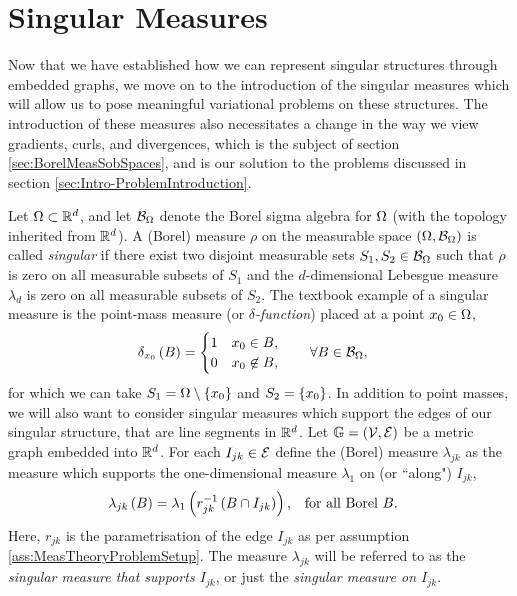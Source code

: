 \section{Singular Measures} \label{sec:SingularMeasures}
Now that we have established how we can represent singular structures through embedded graphs, we move on to the introduction of the singular measures which will allow us to pose meaningful variational problems on these structures.
The introduction of these measures also necessitates a change in the way we view gradients, curls, and divergences, which is the subject of section \ref{sec:BorelMeasSobSpaces}, and is our solution to the problems discussed in section \ref{sec:Intro-ProblemIntroduction}.

Let $\Omega\subset\mathbb{R}^d$, and let $\mathcal{B}_{\Omega}$ denote the Borel sigma algebra for $\Omega$ (with the topology inherited from $\mathbb{R}^d$).
A (Borel) measure $\rho$ on the measurable space $\left( \Omega,\mathcal{B}_{\Omega} \right)$ is called \emph{singular} if there exist two disjoint measurable sets $S_1,S_2\in \mathcal{B}_{\Omega}$ such that $\rho$ is zero on all measurable subsets of $S_1$ and the $d$-dimensional Lebesgue measure $\lambda_d$ is zero on all measurable subsets of $S_2$.
The textbook example of a singular measure is the point-mass measure (or \emph{$\delta$-function}) placed at a point $x_0\in\Omega$,
\begin{align*}
	\delta_{x_0}\left( B \right) &= \begin{cases} 1 & x_0\in B, \\ 0 & x_0\not\in B, \end{cases}
	\qquad \forall B\in\mathcal{B}_{\Omega},
\end{align*}
for which we can take $S_1=\Omega\setminus\left\{ x_0 \right\}$ and $S_2=\left\{ x_0 \right\}$.
In addition to point masses, we will also want to consider singular measures which support the edges of our singular structure, that are line segments in $\mathbb{R}^d$.
Let $\mathbb{G}=\left( \mathcal{V}, \mathcal{E} \right)$ be a metric graph embedded into $\mathbb{R}^d$.
For each $I_{jk}\in\mathcal{E}$ define the (Borel) measure $\lambda_{jk}$ as the measure which supports the one-dimensional measure $\lambda_1$ on (or ``along") $I_{jk}$,
\begin{align*}
	\lambda_{jk}\left( B \right) = \lambda_{1}\left( r_{jk}^{-1}\left( B \cap I_{jk} \right) \right),
	&\quad\text{for all Borel } B.
\end{align*}
Here, $r_{jk}$ is the parametrisation of the edge $I_{jk}$ as per assumption \ref{ass:MeasTheoryProblemSetup}.
The measure $\lambda_{jk}$ will be referred to as the \emph{singular measure that supports $I_{jk}$}, or just the \emph{singular measure on $I_{jk}$}.
